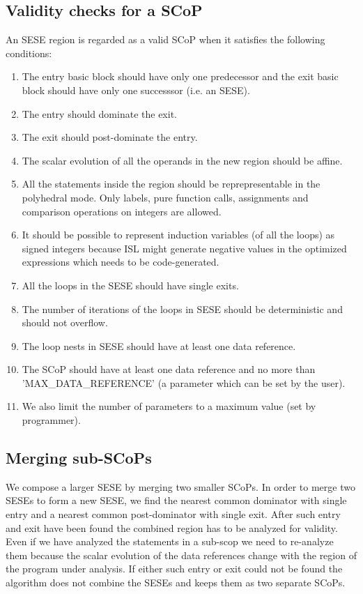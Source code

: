 \documentclass{sigplanconf}
\begin{document}
\subsection{Validity checks for a SCoP}
\label{subsec:validity}
An SESE region is regarded as a valid SCoP when it satisfies the following
conditions:
\begin{enumerate}
\item The entry basic block should have only one predecessor and the exit
  basic block should have only one successsor (i.e. an SESE).
\item The entry should dominate the exit.
\item The exit should post-dominate the entry.
\item The scalar evolution of all the operands in the new region should be affine.
\item All the statements inside the region should be reprepresentable in the
  polyhedral mode.  Only labels, pure function calls, assignments and
  comparison operations on integers are allowed.
\item It should be possible to represent induction variables (of all the loops)
  as signed integers because ISL might generate negative values in the optimized
  expressions which needs to be code-generated.
\item All the loops in the SESE should have single exits.
\item The number of iterations of the loops in SESE should be deterministic and
  should not overflow.
\item The loop nests in SESE should have at least one data reference.
\item The SCoP should have at least one data reference and no more than
  'MAX\_DATA\_REFERENCE' (a parameter which can be set by the user).
\item We also limit the number of parameters to a maximum value (set by
  programmer).
\end{enumerate}



\subsection{Merging sub-SCoPs}
\label{subsec:merge-sese}
We compose a larger SESE by merging two smaller SCoPs. In order to merge two
SESEs to form a new SESE, we find the nearest common dominator with single entry
and a nearest common post-dominator with single exit. After such entry and exit
have been found the combined region has to be analyzed for validity. Even if we
have analyzed the statements in a sub-scop we need to re-analyze them because
the scalar evolution of the data references change with the region of the
program under analysis.  If either such entry or exit could not be found the
algorithm does not combine the SESEs and keeps them as two separate SCoPs.
\end{document}
